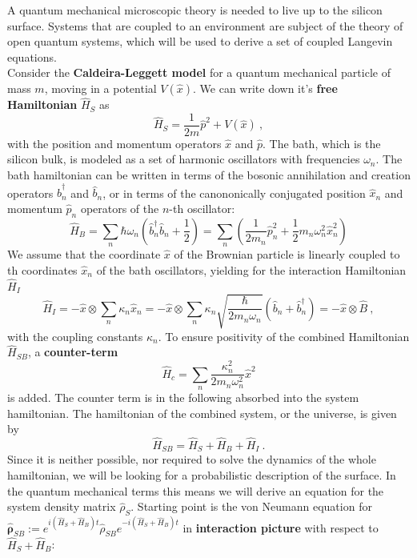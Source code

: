 	A quantum mechanical microscopic theory is needed to live up to the silicon surface. Systems that are coupled to an environment are subject of the theory of open quantum systems, which will be used to derive a set of coupled Langevin equations. \\
	
	Consider the \textbf{Caldeira-Leggett model} \cite{caldeira1981influence} for a quantum mechanical particle of mass $m$, moving in a potential $V(\hat{x})$. We can write down it's \textbf{free Hamiltonian} $\hat{H}_S$ as
	\begin{equation}
		\hat{H}_S =	\frac{1}{2m} \hat{p}^2 + V(\hat{x})~,
	\end{equation}
	with the position and momentum operators $\hat{x}$ and $\hat{p}$. The bath, which is the silicon bulk, is modeled as a set of harmonic oscillators with frequencies $\omega_n$. The bath hamiltonian can be written in terms of the bosonic annihilation and creation operators $\hat{b}_n^\dagger$ and $\hat{b}_n$, or in terms of the canononically conjugated position $\hat{x}_n$ and momentum $\hat{p}_n$ operators of the $n$-th oscillator:
	\begin{equation}
		\hat{H}_B =	\sum_n \hbar \omega_n \left(\hat{b}_n^\dagger \hat{b}_n + \frac{1}{2} \right) =	\sum_n \left(\frac{1}{2 m_n} \hat{p}_n^2 + \frac{1}{2} m_n \omega_n^2 \hat{x}_n^2 \right)
	\end{equation}
	We assume that the coordinate $\hat{x}$ of the Brownian particle is linearly coupled to th coordinates $\hat{x}_n$ of the bath oscillators, yielding for the interaction Hamiltonian $\hat{H}_I$
	\begin{equation}
		\hat{H}_I =	- \hat{x} \otimes \sum_n \kappa_n \hat{x}_n =	-\hat{x} \otimes \sum_n \kappa_n \sqrt{\frac{\hbar}{2 m_n \omega_n}} \left(\hat{b}_n + \hat{b}_n^\dagger\right) =	- \hat{x} \otimes \hat{B} ~,
	\end{equation}
	with the coupling constants $\kappa_n$. To ensure positivity of the combined Hamiltonian $\hat{H}_{SB}$, a \textbf{counter-term}
	\begin{equation}
		\hat{H}_c =	\sum_n \frac{\kappa_n^2}{2 m_n \omega_n^2} \hat{x}^2
	\end{equation}
	is added. The counter term is in the following absorbed into the system hamiltonian. The hamiltonian of the combined system, or the universe, is given by
	\begin{equation}
		\hat{H}_{SB} = \hat{H}_S + \hat{H}_B + \hat{H}_I~.
	\end{equation}
	Since it is neither possible, nor required to solve the dynamics of the whole hamiltonian, we will be looking for a probabilistic description of the surface. In the quantum mechanical terms this means we will derive an equation for the system  density matrix $\hat{\rho}_{S}$. Starting point is the von Neumann equation for $\boldsymbol{\hat{\rho}}_{SB} :=	e^{i \left(\hat{H}_S + \hat{H}_B\right)t} \hat{\rho}_{SB} e^{-i \left(\hat{H}_S + \hat{H}_B\right)t}$ in \textbf{interaction picture} with respect to $\hat{H}_S + \hat{H}_B$:
